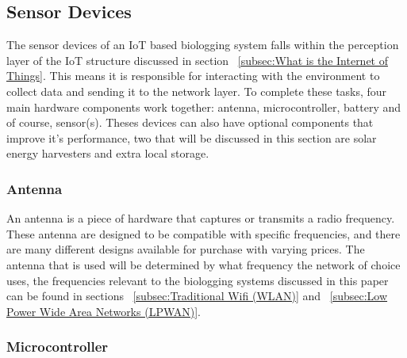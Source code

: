 \documentclass[sigplan,screen,nonacm]{acmart}
\begin{document}
\subsection{Sensor Devices}
\label{subsec:Sensor Devices}

The sensor devices of an IoT based biologging system falls within the perception layer of the IoT 
structure discussed in section ~\ref{subsec:What is the Internet of Things}. This means it is responsible 
for interacting with the environment to collect data and sending it to the network layer. To complete these 
tasks, four main hardware components work together: antenna, microcontroller, battery and of course, sensor(s). 
Theses devices can also have optional components that improve it's performance, two that will be discussed in 
this section are solar energy harvesters and extra local storage. 

\subsubsection{Antenna}
\label{subsubsec:antenna}

An antenna is a piece of hardware that captures or transmits a radio frequency. These antenna are designed to 
be compatible with specific frequencies\cite{Sheldon_2023}, and there are many different designs available for 
purchase with varying prices. The antenna that is used will be determined by what frequency the network of choice 
uses, the frequencies relevant to the biologging systems discussed in this paper can be found in sections 
~\ref{subsec:Traditional Wifi (WLAN)} and ~\ref{subsec:Low Power Wide Area Networks (LPWAN)}.

\subsubsection{Microcontroller}
\label{subsubsec:Microcontroller}
\end{document}
